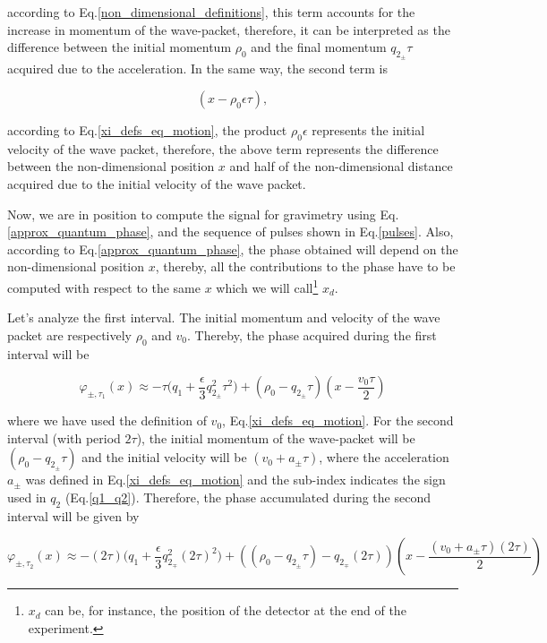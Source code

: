 \documentclass{article}
\begin{document}
according to Eq.\ref{non_dimensional_definitions}, this term accounts for the increase in momentum of the wave-packet, therefore, it can be interpreted as the difference between the initial momentum $\rho_{0}$ and the final momentum $q_{2_{\pm}} \tau$ acquired due to the acceleration. In the same way, the second term is

\begin{equation}\label{position_change}
(x-\rho_{0} \epsilon \tau),
\end{equation}

according to Eq.\ref{xi_defs_eq_motion}, the product $\rho_{0} \epsilon$ represents the initial velocity of the wave packet, therefore, the above term represents the difference between the non-dimensional position $x$ and half of the non-dimensional distance acquired due to the initial velocity of the wave packet.

Now, we are in position to compute the signal for gravimetry using Eq.\ref{approx_quantum_phase}, and the sequence of pulses shown in Eq.\ref{pulses}. Also, according to Eq.\ref{approx_quantum_phase}, the phase obtained will depend on the non-dimensional position $x$, thereby, all the contributions to the phase have to be computed with respect to the same $x$ which we will call\footnote{$x_{d}$ can be, for instance, the position of the detector at the end of the experiment.} $x_{d}$.

Let's analyze the first interval. The initial momentum and velocity of the wave packet are respectively $\rho_{0}$ and $v_{0}$. Thereby, the phase acquired during the first interval will be

\begin{equation}\label{approx_quantum_phase_1}
\varphi_{\pm, \tau_{1}}(x) \approx -\tau \bigg(q_{1} + \frac{\epsilon}{3} q_{2_{\pm}}^{2} \tau^{2}\bigg) + (\rho_{0} - q_{2_{\pm}} \tau)(x-\frac{v_{0} \tau}{2})
\end{equation}

where we have used the definition of $v_{0}$, Eq.\ref{xi_defs_eq_motion}.
For the second interval (with period $2\tau$), the initial momentum of the wave-packet will be $(\rho_{0} - q_{2_{\pm}} \tau)$ and the initial velocity will be $(v_{0}+a_{\pm}\tau)$, where the acceleration $a_{\pm}$ was defined in Eq.\ref{xi_defs_eq_motion} and the sub-index indicates the sign used in $q_{2}$ (Eq.\ref{q1_q2}). Therefore, the phase accumulated during the second interval will be given by

\begin{equation}\label{approx_quantum_phase_2}
\varphi_{\pm, \tau_{2}}(x) \approx -(2\tau) \bigg(q_{1} + \frac{\epsilon}{3} q_{2_{\mp}}^{2} (2\tau)^{2}\bigg) + ((\rho_{0} - q_{2_{\pm}} \tau)-q_{2_{\mp}} (2\tau))(x-\frac{(v_{0}+a_{\pm}\tau) (2\tau)}{2})
\end{equation}
\end{document}

